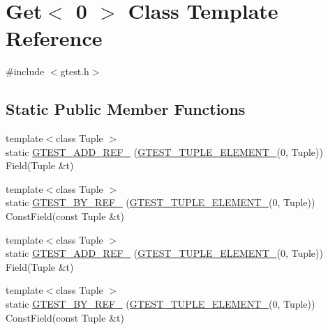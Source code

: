 \hypertarget{classstd_1_1tr1_1_1gtest__internal_1_1Get_3_010_01_4}{\section{\-Get$<$ 0 $>$ \-Class \-Template \-Reference}
\label{d2/dfd/classstd_1_1tr1_1_1gtest__internal_1_1Get_3_010_01_4}
}


{\ttfamily \#include $<$gtest.\-h$>$}

\subsection*{\-Static \-Public \-Member \-Functions}
\begin{DoxyCompactItemize}
\item 
{\footnotesize template$<$class Tuple $>$ }\\static \hyperlink{classstd_1_1tr1_1_1gtest__internal_1_1Get_3_010_01_4_aae83355db72123f25b954bbe7e61ba73}{\-G\-T\-E\-S\-T\-\_\-\-A\-D\-D\-\_\-\-R\-E\-F\-\_\-} (\hyperlink{gtest-tuple_8h_a1b7f133d8aa02e0b7afed7b66781eeb7}{\-G\-T\-E\-S\-T\-\_\-\-T\-U\-P\-L\-E\-\_\-\-E\-L\-E\-M\-E\-N\-T\-\_\-}(0, \-Tuple)) \-Field(\-Tuple \&t)
\item 
{\footnotesize template$<$class Tuple $>$ }\\static \hyperlink{classstd_1_1tr1_1_1gtest__internal_1_1Get_3_010_01_4_a4d8923c2f780aabc2ce28aa7a3689da6}{\-G\-T\-E\-S\-T\-\_\-\-B\-Y\-\_\-\-R\-E\-F\-\_\-} (\hyperlink{gtest-tuple_8h_a1b7f133d8aa02e0b7afed7b66781eeb7}{\-G\-T\-E\-S\-T\-\_\-\-T\-U\-P\-L\-E\-\_\-\-E\-L\-E\-M\-E\-N\-T\-\_\-}(0, \-Tuple)) \-Const\-Field(const \-Tuple \&t)
\item 
{\footnotesize template$<$class Tuple $>$ }\\static \hyperlink{classstd_1_1tr1_1_1gtest__internal_1_1Get_3_010_01_4_aae83355db72123f25b954bbe7e61ba73}{\-G\-T\-E\-S\-T\-\_\-\-A\-D\-D\-\_\-\-R\-E\-F\-\_\-} (\hyperlink{gtest-tuple_8h_a1b7f133d8aa02e0b7afed7b66781eeb7}{\-G\-T\-E\-S\-T\-\_\-\-T\-U\-P\-L\-E\-\_\-\-E\-L\-E\-M\-E\-N\-T\-\_\-}(0, \-Tuple)) \-Field(\-Tuple \&t)
\item 
{\footnotesize template$<$class Tuple $>$ }\\static \hyperlink{classstd_1_1tr1_1_1gtest__internal_1_1Get_3_010_01_4_a4d8923c2f780aabc2ce28aa7a3689da6}{\-G\-T\-E\-S\-T\-\_\-\-B\-Y\-\_\-\-R\-E\-F\-\_\-} (\hyperlink{gtest-tuple_8h_a1b7f133d8aa02e0b7afed7b66781eeb7}{\-G\-T\-E\-S\-T\-\_\-\-T\-U\-P\-L\-E\-\_\-\-E\-L\-E\-M\-E\-N\-T\-\_\-}(0, \-Tuple)) \-Const\-Field(const \-Tuple \&t)
\end{DoxyCompactItemize}


